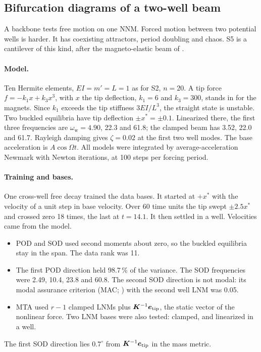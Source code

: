 \documentclass[preprint,12pt]{elsarticle}
\begin{document}
\subsection{Bifurcation diagrams of a two-well beam}\label{sec:moon}
A backbone tests free motion on one NNM. Forced motion between two potential wells is harder. It has coexisting attractors, period doubling and chaos. S5 is a cantilever of this kind, after the magneto-elastic beam of \citet{Moon1979}.

\paragraph{Model.} Ten Hermite elements, $EI=m'=L=1$ as for S2, $n=20$. A tip force $f=-k_1x+k_3x^3$, with $x$ the tip deflection, $k_1=6$ and $k_3=300$, stands in for the magnets. Since $k_1$ exceeds the tip stiffness $3EI/L^3$, the straight state is unstable. Two buckled equilibria have tip deflection $\pm x^*=\pm0.1$. Linearized there, the first three frequencies are $\omega_{\mathrm w}=4.90$, 22.3 and 61.8; the clamped beam has 3.52, 22.0 and 61.7. Rayleigh damping gives $\zeta=0.02$ at the first two well modes. The base acceleration is $A\cos\varOmega t$. All models were integrated by average-acceleration Newmark \citep{Newmark1959} with Newton iterations, at 100 steps per forcing period.

\paragraph{Training and bases.} One cross-well free decay trained the data bases. It started at $+x^*$ with the velocity of a unit step in base velocity. Over 60 time units the tip swept $\pm2.5x^*$ and crossed zero 18 times, the last at $t=14.1$. It then settled in a well. Velocities came from the model.
\begin{itemize}
\item POD and SOD used second moments about zero, so the buckled equilibria stay in the span. The data rank was 11.
\item The first POD direction held 98.7\,\% of the variance. The SOD frequencies were 2.49, 10.4, 23.8 and 60.8. The second SOD direction is not modal: its modal assurance criterion (MAC; \citealp{Allemang2003}) with the second well LNM was 0.05.
\item MTA used $r-1$ clamped LNMs plus $\bm{K}^{-1}\bm{e}_{\mathrm{tip}}$, the static vector of the nonlinear force. Two LNM bases were also tested: clamped, and linearized in a well.
\end{itemize}
The first SOD direction lies $0.7^\circ$ from $\bm{K}^{-1}\bm{e}_{\mathrm{tip}}$ in the mass metric.
\end{document}
